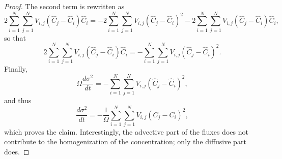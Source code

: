 \begin{proof}
	The second term is rewritten as
	\begin{equation}
 		2 \sum_{i=1}^N \sum_{j=1}^N V_{i,j} (\hat C_j - \hat C_i) \hat C_i = -2 \sum_{i=1}^N \sum_{j=1}^N V_{i,j} (\hat C_j - \hat C_i)^2 - 2\sum_{i=1}^N \sum_{j=1}^N V_{i,j} (\hat C_j - \hat C_i) \hat C_i,
	 \end{equation} 
	 so that
	 \begin{equation}
	 	2 \sum_{i=1}^N \sum_{j=1}^N V_{i,j} (\hat C_j - \hat C_i) \hat C_i = - \sum_{i=1}^N \sum_{j=1}^N V_{i,j} (\hat C_j - \hat C_i)^2.
	 \end{equation}
	 Finally,
	 \begin{equation}
	 	\Omega \frac{d \sigma^2}{dt} = - \sum_{i=1}^N \sum_{j=1}^N V_{i,j} (\hat C_j - \hat C_i)^2,
	 \end{equation}
	 and thus
	 \begin{equation}
	 	\frac{d \sigma^2}{dt} = -\frac{1}{\Omega} \sum_{i=1}^N \sum_{j=1}^N V_{i,j} (C_j - C_i)^2,
	 \end{equation}
	 which proves the claim.  Interestingly, the advective part of the fluxes does not contribute to the homogenization of the concentration; only the diffusive part does.
\end{proof}